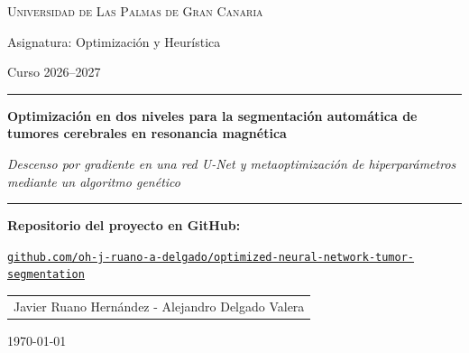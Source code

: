 \documentclass[11pt,a4paper,oneside]{article}
\newcommand{\universidad}{Universidad de Las Palmas de Gran Canaria}
\newcommand{\asignatura}{Optimización y Heurística}
\newcommand{\cursoacademico}{Curso 2026--2027}
\newcommand{\tituloinforme}{Optimización en dos niveles para la segmentación automática de tumores cerebrales en resonancia magnética}
\newcommand{\subtituloinforme}{Descenso por gradiente en una red U-Net y metaoptimización de hiperparámetros mediante un algoritmo genético}
\newcommand{\fechainforme}{\today}
\begin{document}
\hypersetup{pageanchor=false}
\begin{titlepage}
  \centering
  \vspace*{1.2cm}
  {\large\scshape \universidad\par}
  \vspace{0.3cm}
  {\normalsize Asignatura: \asignatura\par}
  {\normalsize \cursoacademico\par}
  \vspace{2.6cm}
  \rule{\linewidth}{0.8pt}\par
  \vspace{0.5cm}
  {\LARGE\bfseries \tituloinforme\par}
  \vspace{0.5cm}
  {\large\itshape \subtituloinforme\par}
  \vspace{0.4cm}
  \rule{\linewidth}{0.8pt}\par
  \vspace{1.8cm}
  {\normalsize\bfseries Repositorio del proyecto en GitHub:\par}
  \vspace{0.2cm}
  {\small\href{https://github.com/oh-j-ruano-a-delgado/optimized-neural-network-tumor-segmentation}{\texttt{github.com/oh-j-ruano-a-delgado/optimized-neural-network-tumor-segmentation}}\par}
  \vspace{1.6cm}
  \begin{tabular}{c}
    \large Javier Ruano Hernández - Alejandro Delgado Valera\\[4pt]
  \end{tabular}\par
  \vfill
  {\large \fechainforme\par}
\end{titlepage}
\hypersetup{pageanchor=true}



\clearpage
\tableofcontents
\clearpage








\clearpage
\printbibliography[heading=bibintoc,title={Referencias}]

\appendix


\end{document}

